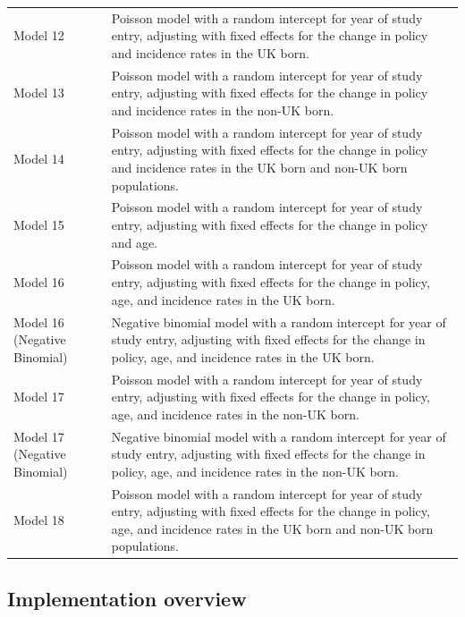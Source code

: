 \documentclass[11pt,twoside]{bristolthesis}
\begin{document}
\begin{table}[!h]
\begin{tabular}{>{\raggedright\arraybackslash}p{2cm}>{\raggedright\arraybackslash}p{10cm}}
  Model 12 & Poisson model with a random intercept for year of study entry, adjusting with fixed effects for the change in policy and incidence rates in the UK born.\\
  Model 13 & Poisson model with a random intercept for year of study entry, adjusting with fixed effects for the change in policy and incidence rates in the non-UK born.\\
  \addlinespace
  Model 14 & Poisson model with a random intercept for year of study entry, adjusting with fixed effects for the change in policy and incidence rates in the UK born and non-UK born populations.\\
  Model 15 & Poisson model with a random intercept for year of study entry, adjusting with fixed effects for the change in policy and age.\\
  Model 16 & Poisson model with a random intercept for year of study entry, adjusting with fixed effects for the change in policy, age, and incidence rates in the UK born.\\
  Model 16 (Negative Binomial) & Negative binomial model with a random intercept for year of study entry, adjusting with fixed effects for the change in policy, age, and incidence rates in the UK born.\\
  Model 17 & Poisson model with a random intercept for year of study entry, adjusting with fixed effects for the change in policy, age, and incidence rates in the non-UK born.\\
  \addlinespace
  Model 17 (Negative Binomial) & Negative binomial model with a random intercept for year of study entry, adjusting with fixed effects for the change in policy, age, and incidence rates in the non-UK born.\\
  Model 18 & Poisson model with a random intercept for year of study entry, adjusting with fixed effects for the change in policy, age, and incidence rates in the UK born and non-UK born populations.\\
  \bottomrule
  \end{tabular}
  \end{table}
  \hypertarget{implementation-overview}{%
  \subsection{Implementation overview}\label{implementation-overview}}
  
\end{document}
